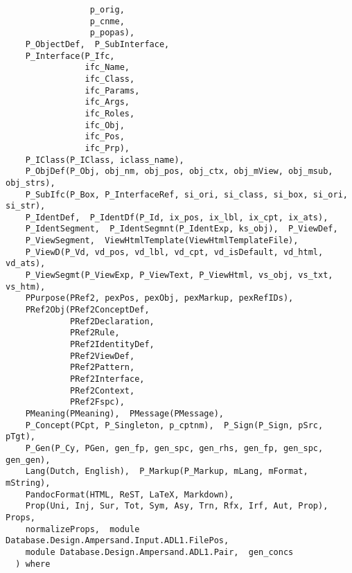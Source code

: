 {\begin{verbatim}
                 p_orig,
                 p_cnme,
                 p_popas), 
    P_ObjectDef,  P_SubInterface, 
    P_Interface(P_Ifc,
                ifc_Name,
                ifc_Class,
                ifc_Params,
                ifc_Args,
                ifc_Roles,
                ifc_Obj,
                ifc_Pos,
                ifc_Prp), 
    P_IClass(P_IClass, iclass_name), 
    P_ObjDef(P_Obj, obj_nm, obj_pos, obj_ctx, obj_mView, obj_msub, obj_strs), 
    P_SubIfc(P_Box, P_InterfaceRef, si_ori, si_class, si_box, si_ori, si_str), 
    P_IdentDef,  P_IdentDf(P_Id, ix_pos, ix_lbl, ix_cpt, ix_ats), 
    P_IdentSegment,  P_IdentSegmnt(P_IdentExp, ks_obj),  P_ViewDef, 
    P_ViewSegment,  ViewHtmlTemplate(ViewHtmlTemplateFile), 
    P_ViewD(P_Vd, vd_pos, vd_lbl, vd_cpt, vd_isDefault, vd_html, vd_ats), 
    P_ViewSegmt(P_ViewExp, P_ViewText, P_ViewHtml, vs_obj, vs_txt, vs_htm), 
    PPurpose(PRef2, pexPos, pexObj, pexMarkup, pexRefIDs), 
    PRef2Obj(PRef2ConceptDef,
             PRef2Declaration,
             PRef2Rule,
             PRef2IdentityDef,
             PRef2ViewDef,
             PRef2Pattern,
             PRef2Interface,
             PRef2Context,
             PRef2Fspc), 
    PMeaning(PMeaning),  PMessage(PMessage), 
    P_Concept(PCpt, P_Singleton, p_cptnm),  P_Sign(P_Sign, pSrc, pTgt), 
    P_Gen(P_Cy, PGen, gen_fp, gen_spc, gen_rhs, gen_fp, gen_spc, gen_gen), 
    Lang(Dutch, English),  P_Markup(P_Markup, mLang, mFormat, mString), 
    PandocFormat(HTML, ReST, LaTeX, Markdown), 
    Prop(Uni, Inj, Sur, Tot, Sym, Asy, Trn, Rfx, Irf, Aut, Prop),  Props, 
    normalizeProps,  module Database.Design.Ampersand.Input.ADL1.FilePos, 
    module Database.Design.Ampersand.ADL1.Pair,  gen_concs
  ) where\end{verbatim}}
\haddockendheader

